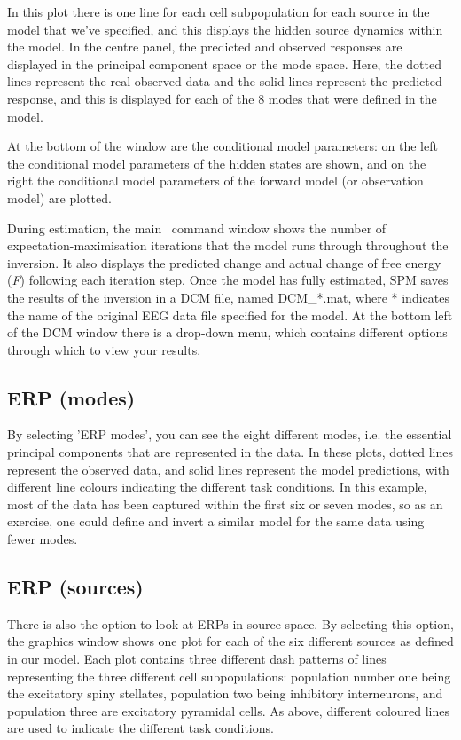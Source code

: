 In this plot there is one line for each cell subpopulation for each
source in the model that we've specified, and this displays the hidden
source dynamics within the model. In the centre panel, the predicted and
observed responses are displayed in the principal component space or the
mode space. Here, the dotted lines represent the real observed data and
the solid lines represent the predicted response, and this is displayed
for each of the 8 modes that were defined in the model.

At the bottom of the window are the conditional model parameters: on the
left the conditional model parameters of the hidden states are shown,
and on the right the conditional model parameters of the forward model
(or observation model) are plotted.

During estimation, the main \matlab\ command window shows the number of
expectation-maximisation iterations that the model runs through
throughout the inversion. It also displays the predicted change and
actual change of free energy (\emph{F}) following each iteration step.
Once the model has fully estimated, SPM saves the results of the
inversion in a DCM file, named DCM\_*.mat, where * indicates the name of
the original EEG data file specified for the model. At the bottom left
of the DCM window there is a drop-down menu, which contains different
options through which to view your results.

\subsection{ERP (modes)}

By selecting 'ERP modes', you can see the eight different modes, i.e.
the essential principal components that are represented in the data. In
these plots, dotted lines represent the observed data, and solid lines
represent the model predictions, with different line colours indicating
the different task conditions. In this example, most of the data has
been captured within the first six or seven modes, so as an exercise,
one could define and invert a similar model for the same data using
fewer modes.

\subsection{ERP (sources)}

There is also the option to look at ERPs in source space. By selecting
this option, the graphics window shows one plot for each of the six
different sources as defined in our model. Each plot contains three
different dash patterns of lines representing the three different cell
subpopulations: population number one being the excitatory spiny
stellates, population two being inhibitory interneurons, and population
three are excitatory pyramidal cells. As above, different coloured lines
are used to indicate the different task conditions.

